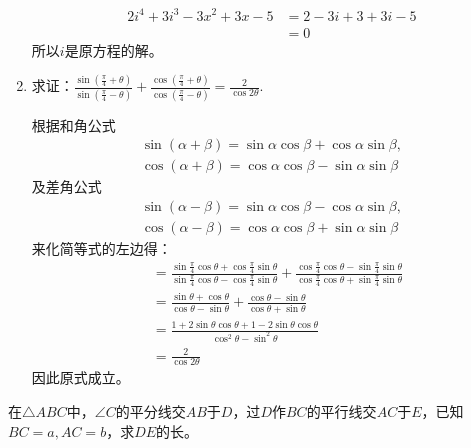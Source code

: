 \documentclass[answers]{exam}
\begin{document}
\begin{questions}
\begin{enumerate}[label=(\arabic*)]
\begin{solution}
\begin{align*}
				      2i^4 + 3i^3 - 3x^2 + 3x - 5 & = 2 - 3i + 3  + 3i - 5 \\
				                                  & = 0
			      \end{align*}
			      所以$i$是原方程的解。
		      \end{solution}
		\item 求证：$\displaystyle
			      \frac{\sin\left(\frac{\pi}{4} + \theta \right)}{\sin \left( \frac{\pi}{4} - \theta \right)} +
			      \frac{\cos\left(\frac{\pi}{4} + \theta \right)}{\cos \left( \frac{\pi}{4} - \theta \right)} =
			      \frac{2}{\cos2\theta}
		      $.
		      \begin{solution}
			      根据和角公式
			      \[
				      \begin{array}{l}
					      \sin(\alpha+\beta) = \sin\alpha\cos\beta + \cos\alpha\sin\beta, \\
					      \cos(\alpha+\beta)=\cos\alpha\cos\beta - \sin\alpha\sin\beta
				      \end{array}
			      \]
			      及差角公式$$
				      \begin{array}{l}
					      \sin(\alpha-\beta) = \sin\alpha\cos\beta - \cos\alpha\sin\beta, \\
					      \cos(\alpha-\beta)=\cos\alpha\cos\beta + \sin\alpha\sin\beta
				      \end{array}
			      $$来化简等式的左边得：
			      \begin{align*}
				       & = 	\frac{\sin\frac{\pi}{4}\cos\theta +
					      \cos\frac{\pi}{4}\sin\theta}{\sin\frac{\pi}{4}\cos\theta-\cos\frac{\pi}{4}\sin\theta} +
				      \frac{\cos\frac{\pi}{4}\cos\theta - \sin\frac{\pi}{4}\sin\theta}{\cos\frac{\pi}{4}\cos\theta +
				      \sin\frac{\pi}{4}\sin\theta}                                                              \\
				       & =
				      \frac{\sin\theta + \cos\theta}{\cos\theta - \sin\theta} + \frac{\cos\theta -
				      \sin\theta}{\cos\theta + \sin\theta}                                                      \\
				       & =
				      \frac{1 + 2\sin\theta\cos\theta + 1 - 2\sin\theta\cos\theta}{\cos^2\theta - \sin^2\theta} \\
				       & = \frac{2}{\cos2\theta}
			      \end{align*}
			      因此原式成立。
		      \end{solution}
	\end{enumerate}
	\question 在$\triangle{ABC}$中，$\angle{C}$的平分线交$AB$于$D$，过$D$作$BC$的平行线交$AC$于$E$，已知$BC=a, AC=b$，求$DE$的长。


\end{questions}
\end{document}
